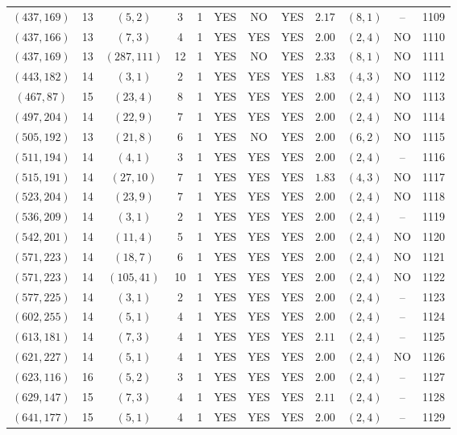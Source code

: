 \begin{longtable}{|c|c|c|c|c|c|c|c|c|c|c|c|}
$(437,169)$ & 13 & $(5,2)$ & 3 & 1 & YES & NO & YES & $2.17$ & $(8,1)$ & -- & 1109\\
$(437,166)$ & 13 & $(7,3)$ & 4 & 1 & YES & YES & YES & $2.00$ & $(2,4)$ & NO & 1110\\
$(437,169)$ & 13 & $(287,111)$ & 12 & 1 & YES & NO & YES & $2.33$ & $(8,1)$ & NO & 1111\\
$(443,182)$ & 14 & $(3,1)$ & 2 & 1 & YES & YES & YES & $1.83$ & $(4,3)$ & NO & 1112\\
$(467,87)$ & 15 & $(23,4)$ & 8 & 1 & YES & YES & YES & $2.00$ & $(2,4)$ & NO & 1113\\
$(497,204)$ & 14 & $(22,9)$ & 7 & 1 & YES & YES & YES & $2.00$ & $(2,4)$ & NO & 1114\\
$(505,192)$ & 13 & $(21,8)$ & 6 & 1 & YES & NO & YES & $2.00$ & $(6,2)$ & NO & 1115\\
$(511,194)$ & 14 & $(4,1)$ & 3 & 1 & YES & YES & YES & $2.00$ & $(2,4)$ & -- & 1116\\
$(515,191)$ & 14 & $(27,10)$ & 7 & 1 & YES & YES & YES & $1.83$ & $(4,3)$ & NO & 1117\\
$(523,204)$ & 14 & $(23,9)$ & 7 & 1 & YES & YES & YES & $2.00$ & $(2,4)$ & NO & 1118\\
$(536,209)$ & 14 & $(3,1)$ & 2 & 1 & YES & YES & YES & $2.00$ & $(2,4)$ & -- & 1119\\
$(542,201)$ & 14 & $(11,4)$ & 5 & 1 & YES & YES & YES & $2.00$ & $(2,4)$ & NO & 1120\\
$(571,223)$ & 14 & $(18,7)$ & 6 & 1 & YES & YES & YES & $2.00$ & $(2,4)$ & NO & 1121\\
$(571,223)$ & 14 & $(105,41)$ & 10 & 1 & YES & YES & YES & $2.00$ & $(2,4)$ & NO & 1122\\
$(577,225)$ & 14 & $(3,1)$ & 2 & 1 & YES & YES & YES & $2.00$ & $(2,4)$ & -- & 1123\\
$(602,255)$ & 14 & $(5,1)$ & 4 & 1 & YES & YES & YES & $2.00$ & $(2,4)$ & -- & 1124\\
$(613,181)$ & 14 & $(7,3)$ & 4 & 1 & YES & YES & YES & $2.11$ & $(2,4)$ & -- & 1125\\
$(621,227)$ & 14 & $(5,1)$ & 4 & 1 & YES & YES & YES & $2.00$ & $(2,4)$ & NO & 1126\\
$(623,116)$ & 16 & $(5,2)$ & 3 & 1 & YES & YES & YES & $2.00$ & $(2,4)$ & -- & 1127\\
$(629,147)$ & 15 & $(7,3)$ & 4 & 1 & YES & YES & YES & $2.11$ & $(2,4)$ & -- & 1128\\
$(641,177)$ & 15 & $(5,1)$ & 4 & 1 & YES & YES & YES & $2.00$ & $(2,4)$ & -- & 1129\\

\end{longtable}
